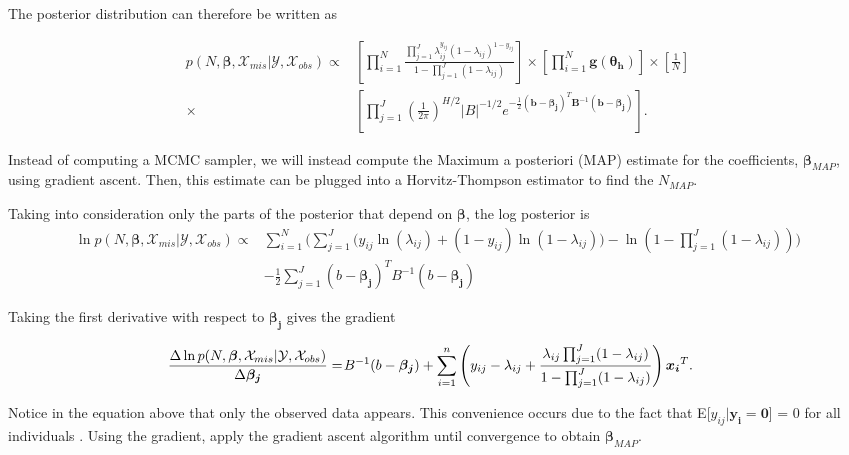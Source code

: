 \documentclass[
  12pt,
]{article}
\begin{document}
The posterior distribution can therefore be written as

\begin{align}
\label{eqn:condposteriorderivevalues}
\nonumber p(N,\boldsymbol{\beta},\mathcal{X}_{mis}|\mathcal{Y},\mathcal{X}_{obs}) \propto &  \left[\prod_{i=1}^N \frac{\prod_{j=1}^J \lambda_{ij}^{y_{ij}}(1-\lambda_{ij})^{1-y_{ij}}}{1-\prod_{j=1}^J(1-\lambda_{ij})} \right] \times \left[ \prod_{i=1}^N \boldsymbol{g}(\boldsymbol{\theta_h}) \right] \times  \left[\frac{1}{N}\right] \\
\times & \left[ \prod_{j=1}^J \left(\frac{1}{2\pi}\right)^{H/2}|B|^{-1/2}e^{-\frac{1}{2}(\boldsymbol{b}-\boldsymbol{\beta_j})^T\boldsymbol{B}^{-1}(\boldsymbol{b}-\boldsymbol{\beta_j})}\right].
\end{align}

Instead of computing a MCMC sampler, we will instead compute the Maximum
a posteriori (MAP) estimate for the coefficients,
\(\boldsymbol{\beta}_{MAP}\), using gradient ascent. Then, this estimate
can be plugged into a Horvitz-Thompson estimator to find the
\(N_{MAP}\).

Taking into consideration only the parts of the posterior that depend on
\(\boldsymbol{\beta}\), the log posterior is \begin{align}
\nonumber \ln p(N,\boldsymbol{\beta},\mathcal{X}_{mis}|\mathcal{Y},\mathcal{X}_{obs}) \propto & \sum_{i=1}^N \Big( \sum_{j=1}^J \Big( y_{ij}\ln(\lambda_{ij}) + (1-y_{ij})\ln(1-\lambda_{ij})\Big) 
- \ln(1-\prod_{j=1}^J(1-\lambda_{ij}))\Big) \\
\nonumber & -\frac{1}{2}\sum_{j=1}^J (b-\boldsymbol{\beta_j})^T B^{-1}(b-\boldsymbol{\beta_j}) 
\end{align}

Taking the first derivative with respect to \(\boldsymbol{\beta_j}\)
gives the gradient

\begin{align}
\frac{\Delta \ln p(N,\boldsymbol{\beta},\mathcal{X}_{mis}|\mathcal{Y},\mathcal{X}_{obs})}{\Delta \boldsymbol{\beta_j}} = & \hspace{1px} B^{-1}(b-\boldsymbol{\beta_j}) + \sum_{i=1}^n \left(y_{ij}-\lambda_{ij}+\frac{\lambda_{ij}\prod_{j=1}^J(1-\lambda_{ij})}{1-\prod_{j=1}^J(1-\lambda_{ij})} \right)\boldsymbol{x_i}^T.
\end{align}

Notice in the equation above that only the observed data appears. This
convenience occurs due to the fact that
E{[}\(y_{ij}|\boldsymbol{y_i}= \boldsymbol{0}\){]} = 0 for all
individuals \citep{alho_logistic_1990}. Using the gradient, apply the
gradient ascent algorithm until convergence to obtain
\(\boldsymbol{\beta}_{MAP}\).
\end{document}
